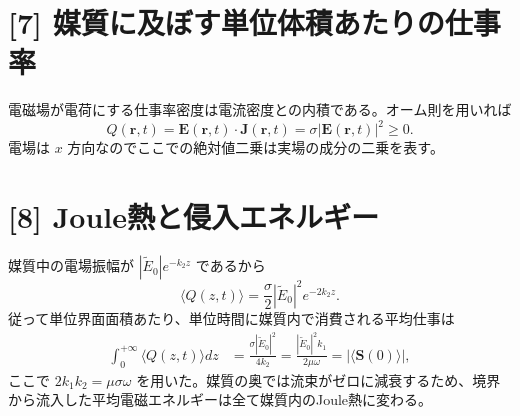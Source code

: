 \documentclass[11pt,a4paper]{article}
\begin{document}
\section*{[7] 媒質に及ぼす単位体積あたりの仕事率}
電磁場が電荷にする仕事率密度は電流密度との内積である。オーム則を用いれば
\begin{equation}
 \boxed{Q(\boldsymbol r,t)=\boldsymbol E(\boldsymbol r,t)\cdot\boldsymbol J(\boldsymbol r,t)
 =\sigma|\boldsymbol E(\boldsymbol r,t)|^2\geq0}.
\end{equation}
電場は $x$ 方向なのでここでの絶対値二乗は実場の成分の二乗を表す。

\section*{[8] Joule熱と侵入エネルギー}
媒質中の電場振幅が $|\widetilde E_0|e^{-k_2z}$ であるから
\begin{equation}
 \langle Q(z,t)\rangle=\frac{\sigma}{2}|\widetilde E_0|^2e^{-2k_2z}.
\end{equation}
従って単位界面面積あたり、単位時間に媒質内で消費される平均仕事は
\begin{align}
 \int_0^{+\infty}\langle Q(z,t)\rangle dz
 &=\frac{\sigma|\widetilde E_0|^2}{4k_2}
 =\frac{|\widetilde E_0|^2k_1}{2\mu\omega}
 =|\langle\boldsymbol S(0)\rangle|,
\end{align}
ここで $2k_1k_2=\mu\sigma\omega$ を用いた。媒質の奥では流束がゼロに減衰するため、境界から流入した平均電磁エネルギーは全て媒質内のJoule熱に変わる。
\end{document}
